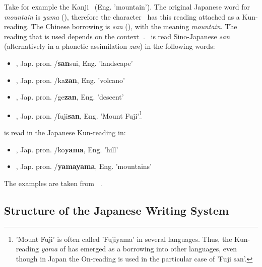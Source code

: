 Take for example the Kanji ~(Eng. 'mountain'). 
The original Japanese word for \emph{mountain} is \emph{yama} (),
therefore the character ~has this reading attached as a Kun-reading.
The Chinese borrowing is \emph{san} (), with the meaning 
\emph{mountain}. The reading that is used depends on the 
context~.
~is read Sino-Japanese \emph{san} (alternatively in a phonetic 
assimilation \emph{zan}) in the following words:
\begin{itemize}
  \item {}, Jap. pron. /\textbf{san}sui, Eng. 'landscape'
  \item {}, Jap. pron. /ka\textbf{zan}, Eng. 'volcano'
  \item {}, Jap. pron. /ge\textbf{zan}, Eng. 'descent'
  \item {}, Jap. pron. /fuji\textbf{san}, Eng. 
        'Mount Fuji'\footnote{'Mount Fuji' is often called 'Fujiyama' in 
        several languages. Thus, the Kun-reading \emph{yama} of  has 
        emerged as a borrowing into other languages, even though in Japan 
        the On-reading is used in the particular case of 'Fuji san'.}
\end{itemize}
 is read in the Japanese Kun-reading in:
\begin{itemize}
  \item {}, Jap. pron. /ko\textbf{yama}, Eng. 'hill'
  \item {}, Jap. pron. /\textbf{yamayama}, Eng. 'mountains'
\end{itemize}
The examples are taken from 
~\citeyear{Hadamitzky1995}.

\subsection{Structure of the Japanese Writing System}
\label{sec:structureofwritingsystem}

